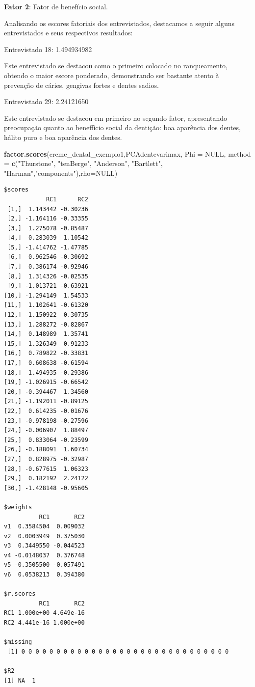 \documentclass[12pt,brazil,oneside]{book}
\newenvironment{Shaded}{\begin{snugshade}}{\end{snugshade}}
\newcommand{\DataTypeTok}[1]{\textcolor[rgb]{0.13,0.29,0.53}{#1}}
\newcommand{\KeywordTok}[1]{\textcolor[rgb]{0.13,0.29,0.53}{\textbf{#1}}}
\newcommand{\NormalTok}[1]{#1}
\newcommand{\OtherTok}[1]{\textcolor[rgb]{0.56,0.35,0.01}{#1}}
\newcommand{\StringTok}[1]{\textcolor[rgb]{0.31,0.60,0.02}{#1}}
\begin{document}
\textbf{Fator 2}: Fator de benefício social.

Analisando os escores fatoriais dos entrevistados, destacamos a seguir
alguns entrevistados e seus respectivos resultados:

Entrevistado 18: 1.494934982

Este entrevistado se destacou como o primeiro colocado no ranqueamento,
obtendo o maior escore ponderado, demonstrando ser bastante atento à
prevenção de cáries, gengivas fortes e dentes sadios.

Entrevistado 29: 2.24121650

Este entrevistado se destacou em primeiro no segundo fator, apresentando
preocupação quanto ao beneffício social da dentição: boa aparência dos
dentes, hálito puro e boa aparência dos dentes.

\begin{Shaded}
\begin{Highlighting}[]
\KeywordTok{factor.scores}\NormalTok{(creme_dental_exemplo1,PCAdentevarimax, }\DataTypeTok{Phi =} \OtherTok{NULL}\NormalTok{, }\DataTypeTok{method =} \KeywordTok{c}\NormalTok{(}\StringTok{"Thurstone"}\NormalTok{, }\StringTok{"tenBerge"}\NormalTok{, }\StringTok{"Anderson"}\NormalTok{, }\StringTok{"Bartlett"}\NormalTok{, }\StringTok{"Harman"}\NormalTok{,}\StringTok{"components"}\NormalTok{),}\DataTypeTok{rho=}\OtherTok{NULL}\NormalTok{)}
\end{Highlighting}
\end{Shaded}

\begin{verbatim}
$scores
            RC1      RC2
 [1,]  1.143442 -0.30236
 [2,] -1.164116 -0.33355
 [3,]  1.275078 -0.85487
 [4,]  0.283039  1.10542
 [5,] -1.414762 -1.47785
 [6,]  0.962546 -0.30692
 [7,]  0.386174 -0.92946
 [8,]  1.314326 -0.02535
 [9,] -1.013721 -0.63921
[10,] -1.294149  1.54533
[11,]  1.102641 -0.61320
[12,] -1.150922 -0.30735
[13,]  1.288272 -0.82867
[14,]  0.148989  1.35741
[15,] -1.326349 -0.91233
[16,]  0.789822 -0.33831
[17,]  0.608638 -0.61594
[18,]  1.494935 -0.29386
[19,] -1.026915 -0.66542
[20,] -0.394467  1.34560
[21,] -1.192011 -0.89125
[22,]  0.614235 -0.01676
[23,] -0.978198 -0.27596
[24,] -0.006907  1.88497
[25,]  0.833064 -0.23599
[26,] -0.188091  1.60734
[27,]  0.828975 -0.32987
[28,] -0.677615  1.06323
[29,]  0.182192  2.24122
[30,] -1.428148 -0.95605

$weights
          RC1       RC2
v1  0.3584504  0.009032
v2  0.0003949  0.375030
v3  0.3449550 -0.044523
v4 -0.0148037  0.376748
v5 -0.3505500 -0.057491
v6  0.0538213  0.394380

$r.scores
          RC1       RC2
RC1 1.000e+00 4.649e-16
RC2 4.441e-16 1.000e+00

$missing
 [1] 0 0 0 0 0 0 0 0 0 0 0 0 0 0 0 0 0 0 0 0 0 0 0 0 0 0 0 0 0 0

$R2
[1] NA  1
\end{verbatim}
\end{document}
